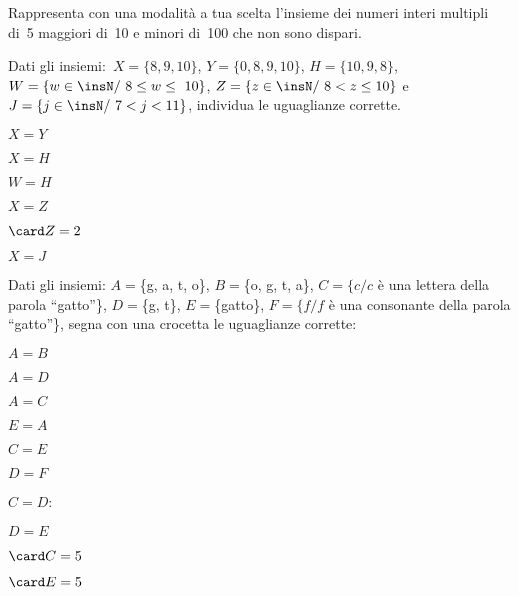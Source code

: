 \begin{esercizio}
\label{ese:6.26}
Rappresenta con una modalità a tua scelta l'insieme dei numeri interi multipli 
di~5 maggiori di~10 e minori di~100 che non
sono dispari.
\end{esercizio}

\begin{esercizio}
\label{ese:6.27}
Dati gli insiemi:~$X=\{8, 9, 10\}$, $Y=\{0, 8, 9, 10\}$, $H=\{10, 9, 8\}$,
$W=\{w\in\insN/\ 8\le w\le~10\}$, $Z=\{z\in\insN/\ 8<z\le10\}$ 
e~$J=\{j\in\insN/\ 7<j<11\}$,
individua le uguaglianze corrette.

\vspace{-.6em}
\begin{multicols}{3}
\begin{enumeratea}
\item $X = Y$
\item $X= H$
\item $W = H$
\item $X = Z$
\item $\card Z=2$
\item $X = J$
\end{enumeratea}
\end{multicols}

\vspace{-1em}
\end{esercizio}

\begin{esercizio}
\label{ese:6.28}
Dati gli insiemi:
$A=$\{g, a, t, o\}, $B=$\{o, g, t, a\}, $C=\{c/c$ è una lettera della parola 
``gatto''\},
$D=$\{g, t\}, $E=$\{gatto\}, $F=\{f / f$ è una consonante della parola 
``gatto''\},
segna con una crocetta le uguaglianze corrette:

\vspace{-.6em}
\begin{multicols}{4}
\begin{enumeratea}
 \item $A = B$
 \item $A = D$
 \item $A = C$
 \item $E = A$
 \item $C = E$
 \item $D = F$
 \item $C = D$:
 \item $D = E$
 \columnbreak
 \item $\card C=5$
 \item $\card E=5$
\end{enumeratea}
\end{multicols}

\vspace{-1em}
\end{esercizio}

